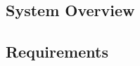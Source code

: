 


\subsection{System Overview}
\label{sub:system_overview}

\subsection{Requirements}
\label{sub:requirements}